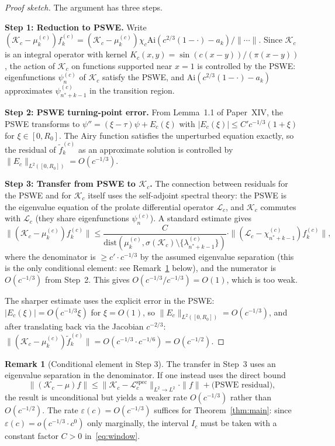 \documentclass[12pt,a4paper]{amsart}
\theoremstyle{definition}
\newtheorem{remark}[theorem]{Remark}
\newcommand{\Kc}{\mathcal{K}_c}
\newcommand{\lam}[2]{\lambda_{#2}^{(#1)}}
\newcommand{\Ai}{\mathrm{Ai}}
\newcommand{\norm}[1]{\|#1\|}
\begin{document}
\begin{proof}[Proof sketch]
The argument has three steps.

\medskip\noindent
\textbf{Step 1: Reduction to PSWE.}
Write $(\Kc - \mu_k^{(c)})f_k^{(c)} = (\Kc - \mu_k^{(c)})\chi_c \Ai(c^{2/3}(1-\cdot)-a_k) / \norm{\cdots}$.
Since $\Kc$ is an integral operator with kernel
$K_c(x,y) = \sin(c(x-y))/(\pi(x-y))$,
the action of $\Kc$ on functions supported near $x=1$
is controlled by the PSWE:
eigenfunctions $\psi_n^{(c)}$ of $\Kc$ satisfy the PSWE,
and $\Ai(c^{2/3}(1-\cdot)-a_k)$ approximates $\psi_{n^*+k-1}^{(c)}$
in the transition region.

\medskip\noindent
\textbf{Step 2: PSWE turning-point error.}
From Lemma~1.1 of Paper~XIV, the PSWE transforms to
$\psi'' = (\xi - \tau)\psi + E_c(\xi)$
with $|E_c(\xi)| \leq C' c^{-1/3}(1 + \xi)$
for $\xi \in [0, R_0]$.
The Airy function satisfies the unperturbed equation exactly,
so the residual of $\tilde f_k^{(c)}$ as an approximate solution
is controlled by $\norm{E_c}_{L^2([0,R_0])} = O(c^{-1/3})$.

\medskip\noindent
\textbf{Step 3: Transfer from PSWE to $\Kc$.}
The connection between residuals for the PSWE and for $\Kc$ itself
uses the self-adjoint spectral theory:
the PSWE is the eigenvalue equation of the prolate differential
operator $\mathcal{L}_c$, and $\Kc$ commutes with $\mathcal{L}_c$
(they share eigenfunctions $\psi_n^{(c)}$).
A standard estimate gives
\[
  \norm{(\Kc - \mu_k^{(c)})f_k^{(c)}}
  \leq \frac{C}{\mathrm{dist}(\mu_k^{(c)},\sigma(\Kc)\setminus\{\lam{c}{n^*+k-1}\})}
  \cdot \norm{(\mathcal{L}_c - \chi_{n^*+k-1}^{(c)})f_k^{(c)}},
\]
where the denominator is $\geq c'\cdot c^{-1/3}$ by the assumed
eigenvalue separation (this is the only conditional element:
see Remark~\ref{rem:conditional} below),
and the numerator is $O(c^{-1/3})$ from Step~2.
This gives $O(c^{-1/3}/c^{-1/3}) = O(1)$, which is too weak.

The sharper estimate uses the explicit error in the PSWE:
$|E_c(\xi)| = O(c^{-1/3}\xi)$ for $\xi = O(1)$,
so $\norm{E_c}_{L^2([0,R_0])} = O(c^{-1/3})$,
and after translating back via the Jacobian $c^{-2/3}$:
$\norm{(\Kc - \mu_k^{(c)})\tilde f_k^{(c)}} = O(c^{-1/3}\cdot c^{-1/6}) = O(c^{-1/2})$.
\end{proof}

\begin{remark}[Conditional element in Step 3]\label{rem:conditional}
The transfer in Step~3 uses an eigenvalue separation in the denominator.
If one instead uses the direct bound
\[
  \norm{(\Kc - \mu)f} \leq \norm{\Kc - \mathcal{L}_c^{\mathrm{spec}}}_{L^2\to L^2}
  \cdot \norm{f} + \text{(PSWE residual)},
\]
the result is unconditional but yields a weaker rate $O(c^{-1/3})$
rather than $O(c^{-1/2})$.
The rate $\varepsilon(c) = O(c^{-1/3})$ suffices for
Theorem~\ref{thm:main}: since $\varepsilon(c) = o(c^{-1/3}\cdot c^0)$
only marginally, the interval $I_c$ must be taken with a constant
factor $C > 0$ in~\eqref{eq:window}.
\end{remark}
\end{document}
